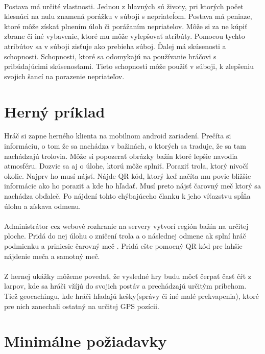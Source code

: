\paragraph{}
Postava má určité vlastnosti. Jednou z hlavných sú životy, pri ktorých počet klesnúci na nulu znamená porážku v súboji s nepriateĺom. Postava má peniaze, ktoré môže získať plnením úloh či porážaním nepriatelov. Môže si za ne kúpiť zbrane či iné vybavenie, ktoré mu môže vylepšovať atribúty. Pomocou tychto atribútov sa v súboji zisťuje ako prebieha súboj. Ďalej má skúsenosti a schopnosti. Schopnosti, ktoré sa odomykajú na používanie hráčovi s pribúdajúcimi skúsenosťami. Tieto schopnosti môže použiť v súboji, k zlepšeniu svojich šancí na porazenie nepriateľov. 

\section{Herný príklad}
Hráč si zapne herného klienta na mobilnom android zariadení. Prečíta si informáciu, o tom že sa nachádza v bažinách, o ktorých sa traduje, že sa tam nachádzajú trolovia. Môže si popozerať obrázky bažín ktoré lepšie navodia atmosféru. Dozvie sa aj o úlohe, ktorú môže splniť. Poraziť trola, ktorý nivočí okolie. Najprv ho musí nájsť. Nájde QR kód, ktorý keď načíta mu povie bližšie informácie ako ho poraziť a kde ho hľadať. Musí preto nájsť čarovný meč ktorý sa nachádza obďaleč. Po nájdení tohto chýbajúceho članku k jeho víťazstvu spĺňa úlohu a získava odmenu.
\paragraph{}
Administrátor cez webové rozhranie na servery vytvorí región bažín na určitej ploche. Pridá do nej úlohu o zničení trola a o následnej odmene ak splní hráč podmienku a priniesie čarovný meč . Pridá ešte pomocný QR kód pre lahšie nájdenie meča a samotný meč.\

\paragraph{}
Z hernej ukážky môžeme povedať, že vysledné hry budu môcť čerpať časť čŕt z larpov, kde sa hráči vžíjú do svojich postáv a prechádzajú určitým príbehom. Tiež geocachingu, kde hráči hľadajú kešky(správy či iné malé prekvapenia), ktoré pre nich zanechali ostatný na určitej GPS pozícii.

\section{Minimálne požiadavky}
